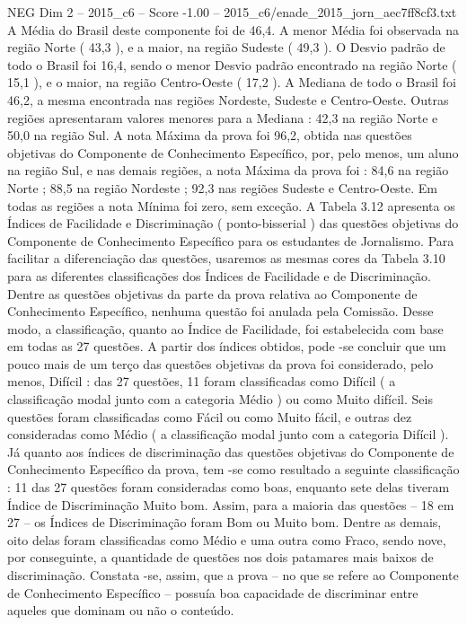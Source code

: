 \begin{textsample}{NEG Dim 2 – 2015\_c6 – Score -1.00 – 2015\_c6/enade\_2015\_jorn\_aec7ff8cf3.txt}
A Média do Brasil deste componente foi de 46,4.
A menor Média foi observada na região Norte ( 43,3 ), e a maior, na região Sudeste ( 49,3 ).
O Desvio padrão de todo o Brasil foi 16,4, sendo o menor Desvio padrão encontrado na região Norte ( 15,1 ), e o maior, na região Centro-Oeste ( 17,2 ).
A Mediana de todo o Brasil foi 46,2, a mesma encontrada nas regiões Nordeste, Sudeste e Centro-Oeste.
Outras regiões apresentaram valores menores para a Mediana : 42,3 na região Norte e 50,0 na região Sul.
A nota Máxima da prova foi 96,2, obtida nas questões objetivas do Componente de Conhecimento Específico, por, pelo menos, um aluno na região Sul, e nas demais regiões, a nota Máxima da prova foi : 84,6 na região Norte ; 88,5 na região Nordeste ; 92,3 nas regiões Sudeste e Centro-Oeste.
Em todas as regiões a nota Mínima foi zero, sem exceção.
A Tabela 3.12 apresenta os Índices de Facilidade e Discriminação ( ponto-bisserial ) das questões objetivas do Componente de Conhecimento Específico para os estudantes de Jornalismo.
Para facilitar a diferenciação das questões, usaremos as mesmas cores da Tabela 3.10 para as diferentes classificações dos Índices de Facilidade e de Discriminação.
Dentre as questões objetivas da parte da prova relativa ao Componente de Conhecimento Específico, nenhuma questão foi anulada pela Comissão.
Desse modo, a classificação, quanto ao Índice de Facilidade, foi estabelecida com base em todas as 27 questões.
A partir dos índices obtidos, pode -se concluir que um pouco mais de um terço das questões objetivas da prova foi considerado, pelo menos, Difícil : das 27 questões, 11 foram classificadas como Difícil ( a classificação modal junto com a categoria Médio ) ou como Muito difícil.
Seis questões foram classificadas como Fácil ou como Muito fácil, e outras dez consideradas como Médio ( a classificação modal junto com a categoria Difícil ).
Já quanto aos índices de discriminação das questões objetivas do Componente de Conhecimento Específico da prova, tem -se como resultado a seguinte classificação : 11 das 27 questões foram consideradas como boas, enquanto sete delas tiveram Índice de Discriminação Muito bom.
Assim, para a maioria das questões – 18 em 27 – os Índices de Discriminação foram Bom ou Muito bom.
Dentre as demais, oito delas foram classificadas como Médio e uma outra como Fraco, sendo nove, por conseguinte, a quantidade de questões nos dois patamares mais baixos de discriminação.
Constata -se, assim, que a prova – no que se refere ao Componente de Conhecimento Específico – possuía boa capacidade de discriminar entre aqueles que dominam ou não o conteúdo.

\end{textsample}
